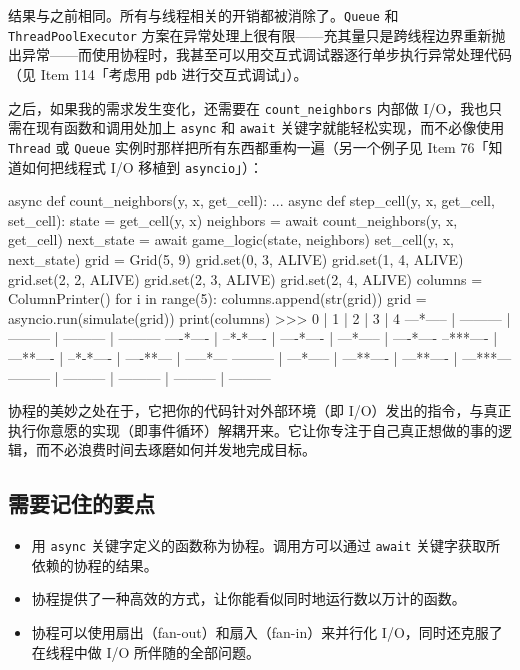 结果与之前相同。所有与线程相关的开销都被消除了。\texttt{Queue} 和 \texttt{ThreadPoolExecutor} 方案在异常处理上很有限——充其量只是跨线程边界重新抛出异常——而使用协程时，我甚至可以用交互式调试器逐行单步执行异常处理代码（见 Item 114「考虑用 \texttt{pdb} 进行交互式调试」）。

之后，如果我的需求发生变化，还需要在 \texttt{count\_neighbors} 内部做 I/O，我也只需在现有函数和调用处加上 \texttt{async} 和 \texttt{await} 关键字就能轻松实现，而不必像使用 \texttt{Thread} 或 \texttt{Queue} 实例时那样把所有东西都重构一遍（另一个例子见 Item 76「知道如何把线程式 I/O 移植到 \texttt{asyncio}」）：

\begin{codebox}[python]
async def count_neighbors(y, x, get_cell):
    ...
async def step_cell(y, x, get_cell, set_cell):
    state = get_cell(y, x)
    neighbors = await count_neighbors(y, x, get_cell)
    next_state = await game_logic(state, neighbors)
    set_cell(y, x, next_state)
grid = Grid(5, 9)
grid.set(0, 3, ALIVE)
grid.set(1, 4, ALIVE)
grid.set(2, 2, ALIVE)
grid.set(2, 3, ALIVE)
grid.set(2, 4, ALIVE)
columns = ColumnPrinter()
for i in range(5):
    columns.append(str(grid))
    grid = asyncio.run(simulate(grid))
print(columns)
>>>
    0     |     1     |     2     |     3     |     4
---*----- | --------- | --------- | --------- | ---------
----*---- | --*-*---- | ----*---- | ---*----- | ----*----
--***---- | ---**---- | --*-*---- | ----**--- | -----*---
--------- | ---*----- | ---**---- | ---**---- | ---***---
--------- | --------- | --------- | --------- | ---------
\end{codebox}

协程的美妙之处在于，它把你的代码针对外部环境（即 I/O）发出的指令，与真正执行你意愿的实现（即事件循环）解耦开来。它让你专注于自己真正想做的事的逻辑，而不必浪费时间去琢磨如何并发地完成目标。

\subsection{需要记住的要点}

\begin{itemize}
\item 用 \texttt{async} 关键字定义的函数称为协程。调用方可以通过 \texttt{await} 关键字获取所依赖的协程的结果。
\item 协程提供了一种高效的方式，让你能看似同时地运行数以万计的函数。
\item 协程可以使用扇出（fan-out）和扇入（fan-in）来并行化 I/O，同时还克服了在线程中做 I/O 所伴随的全部问题。
\end{itemize}

